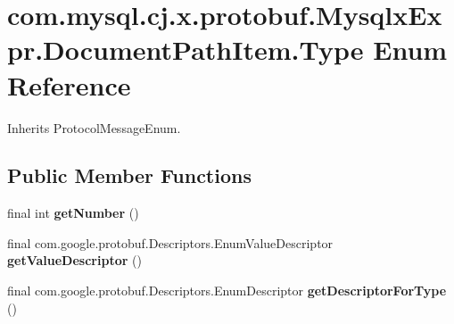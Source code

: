 \hypertarget{enumcom_1_1mysql_1_1cj_1_1x_1_1protobuf_1_1_mysqlx_expr_1_1_document_path_item_1_1_type}{}\section{com.\+mysql.\+cj.\+x.\+protobuf.\+Mysqlx\+Expr.\+Document\+Path\+Item.\+Type Enum Reference}
\label{enumcom_1_1mysql_1_1cj_1_1x_1_1protobuf_1_1_mysqlx_expr_1_1_document_path_item_1_1_type}


Inherits Protocol\+Message\+Enum.

\subsection*{Public Member Functions}
\begin{DoxyCompactItemize}
\item 
\mbox{\label{enumcom_1_1mysql_1_1cj_1_1x_1_1protobuf_1_1_mysqlx_expr_1_1_document_path_item_1_1_type_ab312e50172e44c4d043b4a43be8de8b5}} 
final int {\bfseries get\+Number} ()
\item 
\mbox{\label{enumcom_1_1mysql_1_1cj_1_1x_1_1protobuf_1_1_mysqlx_expr_1_1_document_path_item_1_1_type_a9b4ce917e3b35605364d4fdf0fa86663}} 
final com.\+google.\+protobuf.\+Descriptors.\+Enum\+Value\+Descriptor {\bfseries get\+Value\+Descriptor} ()
\item 
\mbox{\label{enumcom_1_1mysql_1_1cj_1_1x_1_1protobuf_1_1_mysqlx_expr_1_1_document_path_item_1_1_type_a7955e68677cf4216c4c49a882f9d6fb8}} 
final com.\+google.\+protobuf.\+Descriptors.\+Enum\+Descriptor {\bfseries get\+Descriptor\+For\+Type} ()
\end{DoxyCompactItemize}
